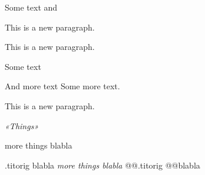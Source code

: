 Some text and

This is a new paragraph.


This is a new paragraph.

Some text

And more text
Some more text.

This is a new paragraph.

\emph{«Things»}

more things
blabla

.titorig
blabla
\emph{more things
blabla}
@@.titorig
@@blabla


